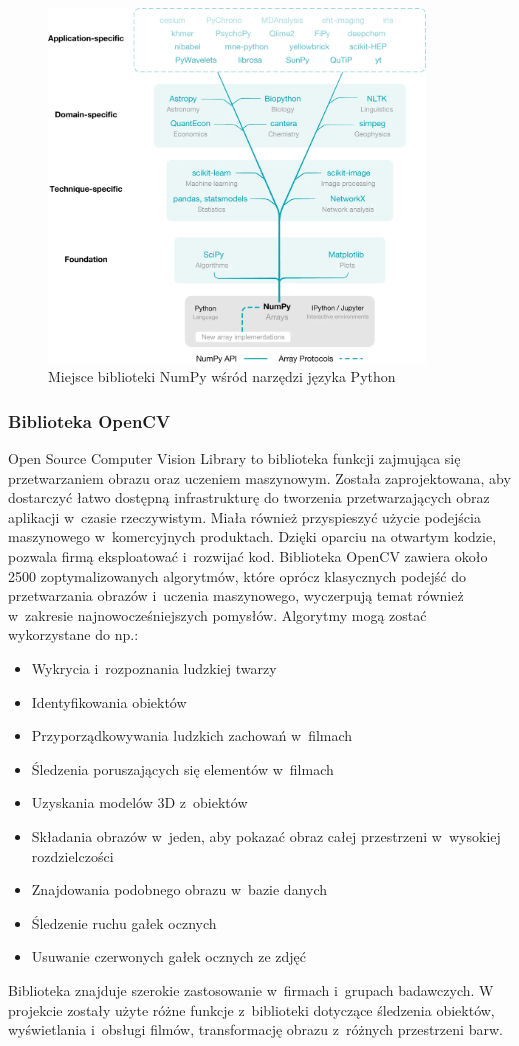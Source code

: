 \begin{figure}
\centering\includegraphics[width=100mm]{figures/numpy.png}
\caption{Miejsce biblioteki NumPy wśród narzędzi języka Python \cite{numpy}}
\label{fig:numpy_applications}
\end{figure}


\subsubsection{Biblioteka OpenCV}
Open Source Computer Vision Library\cite{opencv} to biblioteka funkcji zajmująca się przetwarzaniem obrazu oraz uczeniem maszynowym. Została zaprojektowana, aby dostarczyć łatwo dostępną infrastrukturę do tworzenia przetwarzających obraz aplikacji w~czasie rzeczywistym. Miała również przyspieszyć użycie podejścia maszynowego w~komercyjnych produktach. Dzięki oparciu na otwartym kodzie, pozwala firmą eksploatować i~rozwijać kod. Biblioteka OpenCV zawiera około 2500 zoptymalizowanych algorytmów, które oprócz klasycznych podejść do przetwarzania obrazów i~uczenia maszynowego, wyczerpują temat również w~zakresie najnowocześniejszych pomysłów. Algorytmy mogą zostać wykorzystane do np.:
\begin{itemize}
    \item Wykrycia i~rozpoznania ludzkiej twarzy
    \item Identyfikowania obiektów
    \item Przyporządkowywania ludzkich zachowań w~filmach
    \item Śledzenia poruszających się elementów w~filmach
    \item Uzyskania modelów 3D z~obiektów
    \item Składania obrazów w~jeden, aby pokazać obraz całej przestrzeni w~wysokiej rozdzielczości
    \item Znajdowania podobnego obrazu w~bazie danych
    \item Śledzenie ruchu gałek ocznych
    \item Usuwanie czerwonych gałek ocznych ze zdjęć
\end{itemize}
Biblioteka znajduje szerokie zastosowanie w~firmach i~grupach badawczych.
W projekcie zostały użyte różne funkcje z~biblioteki dotyczące śledzenia obiektów, wyświetlania i~obsługi filmów, transformację obrazu z~różnych przestrzeni barw.

